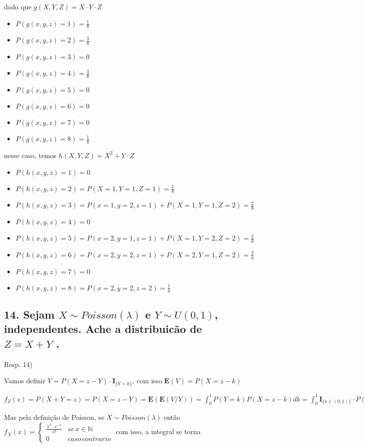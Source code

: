 \documentclass[portuguese]{article}
\begin{document}
dado que $g(X,Y,Z)=X\cdot Y\cdot Z$
\begin{itemize}
\item $P(g(x,y,z)=1)=\frac{1}{8}$
\item $P(g(x,y,z)=2)=\frac{3}{8}$
\item $P(g(x,y,z)=3)=0$
\item $P(g(x,y,z)=4)=\frac{3}{8}$
\item $P(g(x,y,z)=5)=0$
\item $P(g(x,y,z)=6)=0$
\item $P(g(x,y,z)=7)=0$
\item $P(g(x,y,z)=8)=\frac{1}{8}$
\end{itemize}
nesse caso, temos $h(X,Y,Z)=X^{2}+Y\cdot Z$
\begin{itemize}
\item $P(h(x,y,z)=1)=0$
\item $P(h(x,y,z)=2)=P(X=1,Y=1,Z=1)=\frac{1}{8}$
\item $P(h(x,y,z)=3)=P(x=1,y=2,z=1)+P(X=1,Y=1,Z=2)=\frac{2}{8}$
\item $P(h(x,y,z)=4)=0$
\item $P(h(x,y,z)=5)=P(x=2,y=1,z=1)+P(X=1,Y=2,Z=2)=\frac{2}{8}$
\item $P(h(x,y,z)=6)=P(x=2,y=2,z=1)+P(X=2,Y=1,Z=2)=\frac{2}{8}$
\item $P(h(x,y,z)=7)=0$
\item $P(h(x,y,z)=8)=P(x=2,y=2,z=2)=\frac{1}{8}$
\end{itemize}

\subsection*{\textmd{14. Sejam $X\sim Poisson(\lambda)$ e $Y\sim U(0,1)$, independentes.
Ache a distribuicão de $Z=X+Y$ . }}

Resp. 14)

Vamos definir $V=P(X=z-Y)\cdot\mathbf{I}_{\{Y=k\}}$, com isso $\mathbf{E}(V)=P(X=z-k)$

$f_{Z}(z)=P(X+Y=z)=P(X=z-Y)=\mathbf{E}(\mathbf{E}(V/Y))=\int_{0}^{1}P(Y=k)P(X=z-k)dk=\int_{0}^{1}\mathbf{I}_{\{k\in(0,1)\}}\cdot P(X=z-k)dk=\int_{0}^{1}\frac{\lambda^{(z-k)}\cdot e^{-\lambda}}{(z-k)!}dk$

Mas pela definição de Poisson, se $X\sim Poisson(\lambda)$ então
$f_{X}(x)=\begin{cases}
\frac{\lambda^{x}\cdot e^{-\lambda}}{x!} & se\, x\in\mathbb{N}\\
0 & caso\, contrario
\end{cases}$ com isso, a integral se torna
\end{document}
